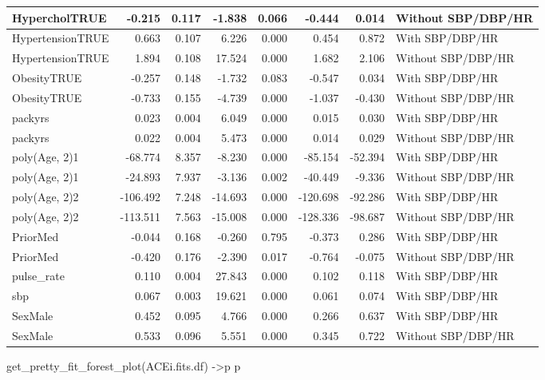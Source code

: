 \documentclass[
]{article}
\newenvironment{Shaded}{\begin{snugshade}}{\end{snugshade}}
\newcommand{\FunctionTok}[1]{\textcolor[rgb]{0.00,0.00,0.00}{#1}}
\newcommand{\NormalTok}[1]{#1}
\newcommand{\OtherTok}[1]{\textcolor[rgb]{0.56,0.35,0.01}{#1}}
\begin{document}
\begin{table}
\begin{tabular}[t]{l|r|r|r|r|r|r|l}
\hline
HypercholTRUE & -0.215 & 0.117 & -1.838 & 0.066 & -0.444 & 0.014 & Without SBP/DBP/HR\\
\hline
HypertensionTRUE & 0.663 & 0.107 & 6.226 & 0.000 & 0.454 & 0.872 & With SBP/DBP/HR\\
\hline
HypertensionTRUE & 1.894 & 0.108 & 17.524 & 0.000 & 1.682 & 2.106 & Without SBP/DBP/HR\\
\hline
ObesityTRUE & -0.257 & 0.148 & -1.732 & 0.083 & -0.547 & 0.034 & With SBP/DBP/HR\\
\hline
ObesityTRUE & -0.733 & 0.155 & -4.739 & 0.000 & -1.037 & -0.430 & Without SBP/DBP/HR\\
\hline
packyrs & 0.023 & 0.004 & 6.049 & 0.000 & 0.015 & 0.030 & With SBP/DBP/HR\\
\hline
packyrs & 0.022 & 0.004 & 5.473 & 0.000 & 0.014 & 0.029 & Without SBP/DBP/HR\\
\hline
poly(Age, 2)1 & -68.774 & 8.357 & -8.230 & 0.000 & -85.154 & -52.394 & With SBP/DBP/HR\\
\hline
poly(Age, 2)1 & -24.893 & 7.937 & -3.136 & 0.002 & -40.449 & -9.336 & Without SBP/DBP/HR\\
\hline
poly(Age, 2)2 & -106.492 & 7.248 & -14.693 & 0.000 & -120.698 & -92.286 & With SBP/DBP/HR\\
\hline
poly(Age, 2)2 & -113.511 & 7.563 & -15.008 & 0.000 & -128.336 & -98.687 & Without SBP/DBP/HR\\
\hline
PriorMed & -0.044 & 0.168 & -0.260 & 0.795 & -0.373 & 0.286 & With SBP/DBP/HR\\
\hline
PriorMed & -0.420 & 0.176 & -2.390 & 0.017 & -0.764 & -0.075 & Without SBP/DBP/HR\\
\hline
pulse\_rate & 0.110 & 0.004 & 27.843 & 0.000 & 0.102 & 0.118 & With SBP/DBP/HR\\
\hline
sbp & 0.067 & 0.003 & 19.621 & 0.000 & 0.061 & 0.074 & With SBP/DBP/HR\\
\hline
SexMale & 0.452 & 0.095 & 4.766 & 0.000 & 0.266 & 0.637 & With SBP/DBP/HR\\
\hline
SexMale & 0.533 & 0.096 & 5.551 & 0.000 & 0.345 & 0.722 & Without SBP/DBP/HR\\
\hline
\end{tabular}
\end{table}

\begin{Shaded}
\begin{Highlighting}[]
\FunctionTok{get\_pretty\_fit\_forest\_plot}\NormalTok{(ACEi.fits.df) }\OtherTok{{-}\textgreater{}}\NormalTok{p}
\NormalTok{p}
\end{Highlighting}
\end{Shaded}
\end{document}
